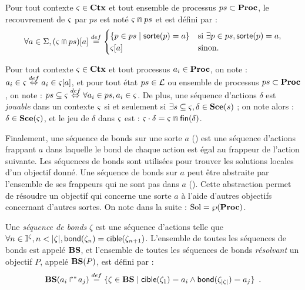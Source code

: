 \begin{definition}
\label{def:ctxcap}
  Pour tout contexte $\varsigma \in \mathbf{Ctx}$ et tout ensemble de processus $ps \subset \mathbf{Proc}$,
  le recouvrement de $\varsigma$ par $ps$ est noté $\varsigma \Cap ps$ et est défini par :
    \[ \forall a \in \Sigma, {(\varsigma \Cap ps)[a]} \stackrel{def}=
      \begin{cases}
        \{ p \in ps \mid \mathsf{sorte}(p)=a \} & \text{si } \exists p \in ps, \mathsf{sorte}(p)=a,\\
        {\varsigma[a]} & \text{sinon.}
      \end{cases} \]
\end{definition}

Pour tout contexte $\varsigma \in \mathbf{Ctx}$ et tout processus $a_i \in \mathbf{Proc}$, on note :
$a_i \in \varsigma \stackrel{def}\Leftrightarrow a_i \in {\varsigma[a]}$,
et pour tout état $ps \in \mathcal{L}$ ou ensemble de processus $ps \subset \mathbf{Proc}$, on note :
$ps \subseteq \varsigma \stackrel{def}\Leftrightarrow \forall a_i \in ps, a_i \in \varsigma$.
De plus, une séquence d'actions $\delta$ est \emph{jouable} dans un contexte $\varsigma$
si et seulement si $\exists s \subseteq \varsigma, \delta \in \mathbf{Sce}(s)$ ;
on note alors : $\delta \in \mathbf{Sce}(\varsigma)$,
et le jeu de $\delta$ dans $\varsigma$ est : $\varsigma \cdot \delta = \varsigma \Cap \mathsf{fin}(\delta)$.

Finalement, une séquence de bonds sur une sorte $a$ () est une séquence d'actions
frappant $a$ dans laquelle le bond de chaque action est égal au frappeur de l'action suivante.
Les séquences de bonds sont utilisées pour trouver les solutions locales d'un objectif donné.
Une séquence de bonds sur $a$ peut être abstraite par l'ensemble de ses frappeurs qui ne sont
pas dans $a$ ().
Cette abstraction permet de résoudre un objectif qui concerne une sorte $a$
à l'aide d'autres objectifs concernant d'autres sortes.
On note dans la suite : $\mathrm{Sol} = \wp(\mathbf{Proc})$.

\begin{definition}
  Une \emph{séquence de bonds} $\zeta$ est une séquence d'actions telle que
  $\forall n \in \mathbb{I}^{\zeta}, n < |\zeta|, \mathsf{bond}(\zeta_{n}) = \mathsf{cible}(\zeta_{n+1})$.
  L'ensemble de toutes les séquences de bonds est appelé $\mathbf{BS}$,
  et l'ensemble de toutes les séquences de bonds \emph{résolvant} un objectif $P$, appelé $\mathbf{BS}(P)$,
  est défini par :
    \[ \mathbf{BS}(\mbox{$a_i\Rsh^*\!a_j$}) \stackrel{def}= \{ \zeta \in \mathbf{BS} \mid
      \mathsf{cible}(\zeta_1) = a_i \wedge \mathsf{bond}(\zeta_{|\zeta|}) = a_j \} \enspace. \]
\end{definition}

